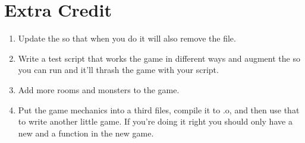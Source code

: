 \section{Extra Credit}

\begin{enumerate}
\item Update the  so that when you do  
     it will also remove the  file.
\item Write a test script that works the game in different ways and augment
    the  so you can run  and it'll thrash
    the game with your script.
\item Add more rooms and monsters to the game.
\item Put the game mechanics into a third files, compile it to .o, and then
    use that to write another little game.  If you're doing it right
    you should only have a new  and a  function
    in the new game.
\end{enumerate}

